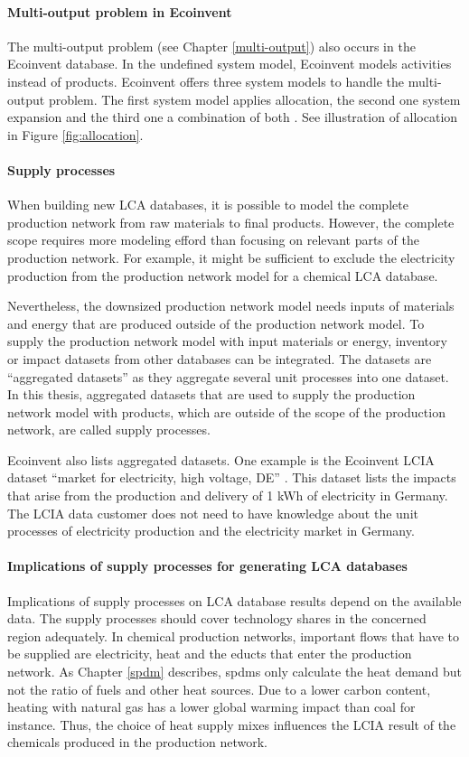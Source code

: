 \paragraph{Multi-output problem in Ecoinvent}The multi-output problem (see Chapter \ref{multi-output}) also occurs in the Ecoinvent database. In the undefined system model, Ecoinvent models activities instead of products. Ecoinvent offers three system models to handle the multi-output problem. The first system model applies allocation, the second one system expansion and the third one a combination of both  \cite{Wernet.2016}. See illustration of allocation in Figure \ref{fig:allocation}.

\paragraph{Supply processes} When building new LCA databases, it is possible to model the complete production network from raw materials to final products. However, the complete scope requires more modeling efford than focusing on relevant parts of the production network. For example, it might be sufficient to exclude the electricity production from the production network model for a chemical LCA database. 

Nevertheless, the downsized production network model needs inputs of materials and energy that are produced outside of the production network model. To supply the production network model with input materials or energy, inventory or impact datasets from other databases can be integrated. The datasets are ``aggregated datasets'' as they aggregate several unit processes into one dataset. In this thesis, aggregated datasets that are used to supply the production network model with products, which are outside of the scope of the production network, are called supply processes. 

Ecoinvent also lists aggregated datasets. One example is the  Ecoinvent LCIA dataset ``market for electricity, high voltage, DE'' \cite{TreyerK..}. This dataset lists the impacts that arise from the production and delivery of 1 kWh of electricity in Germany. The LCIA data customer does not need to have knowledge about the unit processes of electricity production and the electricity market in Germany.

\paragraph{Implications of supply processes for generating LCA databases}
Implications of supply processes on LCA database results depend on the available data. The supply processes should cover technology shares in the concerned region adequately. In chemical production networks, important flows that have to be supplied are electricity, heat and the educts that enter the production network. As Chapter \ref{spdm} describes, \aclp{spdm} only calculate the heat demand but not the ratio of fuels and other heat sources. Due to a lower carbon content, heating with natural gas has a lower global warming impact than coal for instance. Thus, the choice of heat supply mixes influences the LCIA result of the chemicals produced in the production network. 

